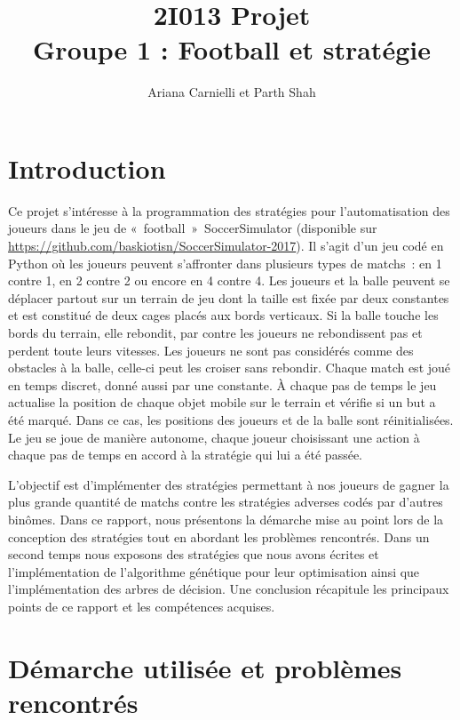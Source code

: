 \documentclass[a4paper,12pt]{article}
\numberwithin{equation}{section}
\begin{document}
\title{2I013 Projet \\ Groupe 1 : Football et stratégie}
\author{Ariana Carnielli et Parth Shah}
\date{}

\maketitle

\tableofcontents
\newpage

\section{Introduction}

Ce projet s’intéresse à la programmation des stratégies pour l’automatisation des joueurs dans le jeu de  « football » SoccerSimulator (disponible sur \url{https://github.com/baskiotisn/SoccerSimulator-2017}). Il s'agit d'un jeu codé en Python où les joueurs peuvent s’affronter dans plusieurs types de matchs : en 1 contre 1, en 2 contre 2 ou encore en 4 contre 4. Les joueurs et la balle peuvent se déplacer partout sur un terrain de jeu dont la taille est fixée par deux constantes et est constitué de deux cages placés aux bords verticaux. Si la balle touche les bords du terrain, elle rebondit, par contre les joueurs ne rebondissent pas et perdent toute leurs vitesses. Les joueurs ne sont pas considérés comme des obstacles à la balle, celle-ci peut les croiser sans rebondir. Chaque match est joué en temps discret, donné aussi par une constante. À chaque pas de temps le jeu actualise la position de chaque objet mobile sur le terrain et vérifie si un but a été marqué. Dans ce cas, les positions des joueurs et de la balle sont réinitialisées. Le jeu se joue de manière autonome, chaque joueur choisissant une action à chaque pas de temps en accord à la stratégie qui lui a été passée.

L’objectif est d’implémenter des stratégies permettant à nos joueurs de gagner la plus grande quantité de matchs contre les stratégies adverses codés par d'autres binômes. Dans ce rapport, nous présentons la démarche mise au point lors de la conception des stratégies tout en abordant les problèmes rencontrés. Dans un second temps nous exposons des stratégies que nous avons écrites et l'implémentation de l’algorithme génétique pour leur optimisation ainsi que l’implémentation des arbres de décision. Une conclusion récapitule les principaux points de ce rapport et les compétences acquises.

\section{Démarche utilisée et problèmes rencontrés}
\end{document}
